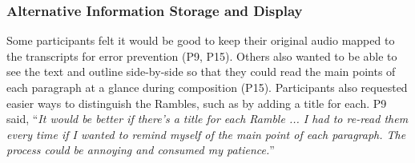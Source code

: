 \subsubsection{Alternative Information Storage and Display} Some participants felt it would be good to keep their original audio mapped to the transcripts for error prevention (P9, P15). Others also wanted to be able to see the text and outline side-by-side so that they could read the main points of each paragraph at a glance during composition (P15). Participants also requested easier ways to distinguish the Rambles, such as by adding a title for each. P9 said, ``\emph{It would be better if there's a title for each Ramble ... I had to re-read them every time if I wanted to remind myself of the main point of each paragraph. The process could be annoying and consumed my patience.}''